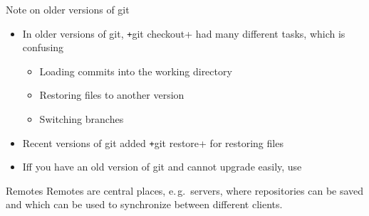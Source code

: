 \begin{frame}[c, fragile]{Note on older versions of git}
  \begin{itemize}
    \item In older versions of git, \texttt+git checkout+ had many different tasks, which is confusing
      \begin{itemize}
        \item Loading commits into the working directory
        \item Restoring files to another version
        \item Switching branches
      \end{itemize}
    \item Recent versions of git added \texttt+git restore+ for restoring files
    \item Iff you have an old version of git and cannot upgrade easily, use
  \end{itemize}
\end{frame}

\begin{frame}{Remotes}
  Remotes are central places, e.\,g.\ servers, where repositories can be saved and which can be used to synchronize between different clients.
  \begin{center}
  \end{center}
\end{frame}

